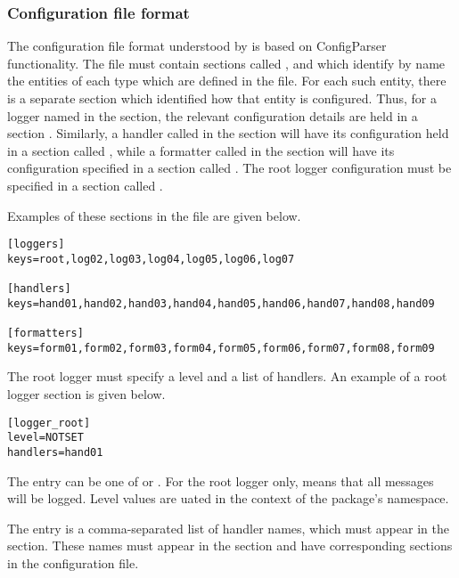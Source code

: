 \subsubsection{Configuration file format%
               \label{logging-config-fileformat}}

The configuration file format understood by  is
based on ConfigParser functionality. The file must contain sections
called \code{[loggers]}, \code{[handlers]} and \code{[formatters]}
which identify by name the entities of each type which are defined in
the file. For each such entity, there is a separate section which
identified how that entity is configured. Thus, for a logger named
 in the \code{[loggers]} section, the relevant
configuration details are held in a section
. Similarly, a handler called  in
the \code{[handlers]} section will have its configuration held in a
section called , while a formatter called
 in the \code{[formatters]} section will have its
configuration specified in a section called
. The root logger configuration must be
specified in a section called .

Examples of these sections in the file are given below.

\begin{verbatim}
[loggers]
keys=root,log02,log03,log04,log05,log06,log07

[handlers]
keys=hand01,hand02,hand03,hand04,hand05,hand06,hand07,hand08,hand09

[formatters]
keys=form01,form02,form03,form04,form05,form06,form07,form08,form09
\end{verbatim}

The root logger must specify a level and a list of handlers. An
example of a root logger section is given below.

\begin{verbatim}
[logger_root]
level=NOTSET
handlers=hand01
\end{verbatim}

The  entry can be one of  or . For the root logger only,
 means that all messages will be logged. Level values are
uated in the context of the  package's
namespace.

The  entry is a comma-separated list of handler names,
which must appear in the \code{[handlers]} section. These names must
appear in the \code{[handlers]} section and have corresponding
sections in the configuration file.

